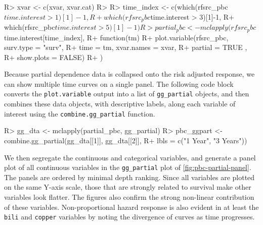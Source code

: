 \documentclass[article, nojss]{jss}
\begin{document}
\begin{Schunk}
\begin{Sinput}
R> xvar <- c(xvar, xvar.cat)
R>
R> time_index <- c(which(rfsrc_pbc$time.interest > 1)[1]-1,
R+                 which(rfsrc_pbc$time.interest > 3)[1]-1,
R+                 which(rfsrc_pbc$time.interest > 5)[1]-1)
R> partial_pbc <- mclapply(rfsrc_pbc$time.interest[time_index],
R+                         function(tm){
R+                           plot.variable(rfsrc_pbc, surv.type = "surv",
R+                                         time = tm, xvar.names = xvar,
R+                                         partial = TRUE ,
R+                                         show.plots = FALSE)
R+                         })
\end{Sinput}
\end{Schunk}

Because partial dependence data is collapsed onto the risk adjusted
response, we can show multiple time curves on a single panel. The
following code block converts the \texttt{plot.variable} output into a
list of \texttt{gg\_partial} objects, and then combines these data
objects, with descriptive labels, along each variable of interest using
the \texttt{combine.gg\_partial} function.

\begin{Schunk}
\begin{Sinput}
R> gg_dta <- mclapply(partial_pbc, gg_partial)
R> pbc_ggpart <- combine.gg_partial(gg_dta[[1]], gg_dta[[2]],
R+                                  lbls = c("1 Year", "3 Years"))
\end{Sinput}
\end{Schunk}

We then segregate the continuous and categorical variables, and generate
a panel plot of all continuous variables in the \texttt{gg\_partial}
plot of \autoref{fig:pbc-partial-panel}. The panels are ordered by
minimal depth ranking. Since all variables are plotted on the same
Y-axis scale, those that are strongly related to survival make other
variables look flatter. The figures also confirm the strong non-linear
contribution of these variables. Non-proportional hazard response is
also evident in at least the \texttt{bili} and \texttt{copper} variables
by noting the divergence of curves as time progresses.
\end{document}
